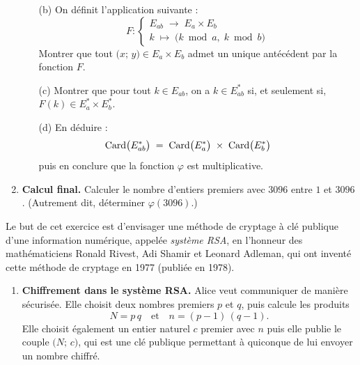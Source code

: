 \documentclass[a4paper,12pt]{article}
\begin{document}
\begin{multicols}{2}
\begin{exercice}[title=Exercice 27 $\star\star\star$ { [Chercher, Raisonner] }]{}{}
\begin{enumerate}
\begin{enumerate}
        \item[(b)] On définit l'application suivante :
          $$
          F:
          \begin{cases}
            E_{ab} \;\longrightarrow\; E_a \times E_b\\
            k \;\longmapsto\; \bigl(k \bmod a,\;k \bmod b\bigr)
          \end{cases}
          $$
          Montrer que tout \(\bigl(x;\,y\bigr) \in E_a \times E_b\) admet un unique antécédent par la fonction \(F\).

        \item[(c)] Montrer que pour tout \(k \in E_{ab}\), on a \(k \in E_{ab}^*\) si, et seulement si, \(F(k) \in E_a^* \times E_b^*\).

        \item[(d)] En déduire :
          \[
            \hspace*{-2em}\mathrm{Card}\bigl(E_{ab}^*\bigr)
            \;=\;
            \mathrm{Card}\bigl(E_a^*\bigr)
            \;\times\;
            \mathrm{Card}\bigl(E_b^*\bigr)
          \]
          puis en conclure que la fonction \(\varphi\) est multiplicative.
      \end{enumerate}

    \item \textbf{Calcul final.}
      Calculer le nombre d'entiers premiers avec \(3096\) entre \(1\) et \(3096\).
      (Autrement dit, déterminer \(\varphi(3096)\).)
  \end{enumerate}
\end{exercice}

\newpage

\begin{exercice}[title=Exercice 28 $\star\star\star$ { [Modéliser, Calculer] }]{}{}
  Le but de cet exercice est d'envisager une méthode de cryptage à clé publique d'une information numérique, appelée \emph{système RSA}, en l'honneur des mathématiciens Ronald Rivest, Adi Shamir et Leonard Adleman, qui ont inventé cette méthode de cryptage en 1977 (publiée en 1978).
  \begin{enumerate}
    \item \textbf{Chiffrement dans le système RSA.}
      Alice veut communiquer de manière sécurisée. Elle choisit deux nombres premiers \(p\) et \(q\), puis calcule les produits
      \[
        N = p\,q
        \quad\text{et}\quad
        n = (p - 1)\,(q - 1).
      \]
      Elle choisit également un entier naturel \(c\) premier avec \(n\) puis elle publie le couple \(\bigl(N;\,c\bigr)\), qui est une clé publique permettant à quiconque de lui envoyer un nombre chiffré.


\end{enumerate}
\end{exercice}
\end{multicols}
\end{document}
